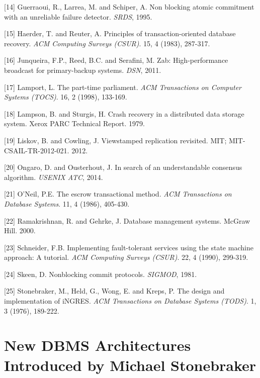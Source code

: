 \documentclass[b5paper,11pt,twoside,openright]{book}
\newcommand\Chapter[3]{
  \hypertarget{#1}{
    \chapter[#2]{#2\\{\Large #3}}
  }
}
\begin{document}
\leavevmode\hypertarget{ref-ac-srds}{}%
{[}14{]} Guerraoui, R., Larrea, M. and Schiper, A. Non blocking atomic
commitment with an unreliable failure detector. \emph{SRDS}, 1995.

\leavevmode\hypertarget{ref-haerder-reuter}{}%
{[}15{]} Haerder, T. and Reuter, A. Principles of transaction-oriented
database recovery. \emph{ACM Computing Surveys (CSUR)}. 15, 4 (1983),
287-317.

\leavevmode\hypertarget{ref-zab}{}%
{[}16{]} Junqueira, F.P., Reed, B.C. and Serafini, M. Zab:
High-performance broadcast for primary-backup systems. \emph{DSN}, 2011.

\leavevmode\hypertarget{ref-paxos}{}%
{[}17{]} Lamport, L. The part-time parliament. \emph{ACM Transactions on
  Computer Systems (TOCS)}. 16, 2 (1998), 133-169.

\leavevmode\hypertarget{ref-lampson-2pc}{}%
{[}18{]} Lampson, B. and Sturgis, H. Crash recovery in a distributed
data storage system. Xerox PARC Technical Report. 1979.

\leavevmode\hypertarget{ref-vrr}{}%
{[}19{]} Liskov, B. and Cowling, J. Viewstamped replication revisited.
MIT; MIT-CSAIL-TR-2012-021. 2012.

\leavevmode\hypertarget{ref-raft}{}%
{[}20{]} Ongaro, D. and Ousterhout, J. In search of an understandable
consensus algorithm. \emph{USENIX ATC}, 2014.

\leavevmode\hypertarget{ref-escrow}{}%
{[}21{]} O'Neil, P.E. The escrow transactional method. \emph{ACM
  Transactions on Database Systems}. 11, 4 (1986), 405-430.

\leavevmode\hypertarget{ref-cowbook}{}%
{[}22{]} Ramakrishnan, R. and Gehrke, J. Database management systems.
McGraw Hill. 2000.

\leavevmode\hypertarget{ref-statemachine}{}%
{[}23{]} Schneider, F.B. Implementing fault-tolerant services using the
state machine approach: A tutorial. \emph{ACM Computing Surveys (CSUR)}.
22, 4 (1990), 299-319.

\leavevmode\hypertarget{ref-3pc}{}%
{[}24{]} Skeen, D. Nonblocking commit protocols. \emph{SIGMOD}, 1981.

\leavevmode\hypertarget{ref-ingres}{}%
{[}25{]} Stonebraker, M., Held, G., Wong, E. and Kreps, P. The design
and implementation of iNGRES. \emph{ACM Transactions on Database Systems
  (TODS)}. 1, 3 (1976), 189-222.


\Chapter{ch4-newdbms}{%
New DBMS Architectures
}{%
Introduced by Michael Stonebraker
}
\end{document}

